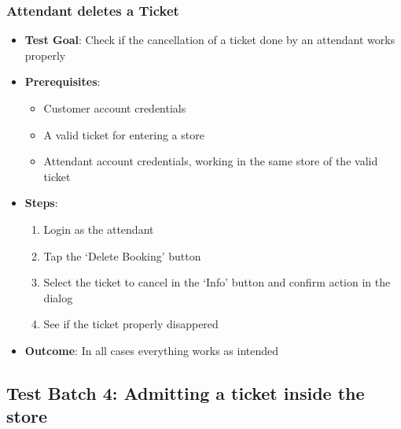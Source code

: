 \subsubsection{Attendant deletes a Ticket}
\begin{itemize}
    \item \textbf{Test Goal}: Check if the cancellation of a ticket done by an attendant works properly
    \item \textbf{Prerequisites}:
          \begin{itemize}
              \item Customer account credentials
              \item A valid ticket for entering a store
              \item Attendant account credentials, working in the same store of the valid ticket
          \end{itemize}
    \item \textbf{Steps}:
          \begin{enumerate}
              \item Login as the attendant
              \item Tap the `Delete Booking' button
              \item Select the ticket to cancel in the `Info' button and confirm action in the dialog
              \item See if the ticket properly disappered
          \end{enumerate}
    \item \textbf{Outcome}: In all cases everything works as intended
\end{itemize}

\clearpage

\subsection{Test Batch 4: Admitting a ticket inside the store}
